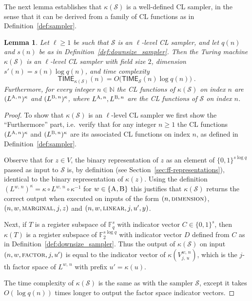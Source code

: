 \documentclass[11pt]{article}
\newtheorem{lemma}[theorem]{Lemma}
\theoremstyle{definition}
\newcommand{\N}{\ensuremath{\mathbb{N}}}
\newcommand{\F}{\ensuremath{\mathbb{F}}}
\newcommand{\downsize}{\kappa}
\newcommand{\sampler}{\mathcal{S}}
\newcommand{\gamestyle}[1]{\ensuremath{\textsc{#1}}\xspace}
\newcommand{\labelstyle}[1]{\ensuremath{\textsc{#1}}\xspace}
\newcommand{\alice}{\labelstyle{A}}
\newcommand{\bob}{\labelstyle{B}}
\newcommand{\ab}{\{\alice, \bob\}}
\newcommand{\TIME}{\mathsf{TIME}}
\begin{document}
The next lemma establishes that $\downsize(\sampler)$ is a well-defined CL
sampler, in the sense that it can be derived from a family of CL functions as in
Definition~\ref{def:sampler}.

\begin{lemma}
  \label{lem:downsize_sampler}
  Let $\ell \geq 1$ be such that $\sampler$ is an $\ell$-level CL sampler, and
  let $q(n)$ and $s(n)$ be as in Definition~\ref{def:downsize_sampler}.
  Then the Turing machine $\downsize(\sampler)$ is an $\ell$-level CL sampler
  with field size $2$, dimension $s'(n) = s(n) \log q(n)$, and
  time complexity
  \begin{equation*}
\TIME_{\downsize(\sampler)}(n) = O \bigl( \TIME_\sampler(n) \log q(n) \bigr)\;.
  \end{equation*}
  Furthermore, for every integer $n \in \N$ the CL functions of
  $\downsize(\sampler)$ on index $n$ are $(L^{\alice,\, n})^\downsize$ and
  $(L^{\bob,\, n})^\downsize$, where $L^{\alice,\, n}, L^{\bob,\, n}$ are the CL
  functions of $\sampler$ on index $n$.
\end{lemma}

\begin{proof} 
  To show that $\downsize(\sampler)$ is an $\ell$-level CL sampler we first show
  the ``Furthermore'' part, i.e.\ verify that for any integer $n\geq 1$ the CL
  functions $(L^{\alice,\, n})^\downsize$ and $(L^{\bob,\, n})^\downsize$ are its
  associated CL functions on index $n$, as defined in
  Definition~\ref{def:sampler}.

  Observe that for $z\in V$, the binary representation of $z$ as an element of
  $\{0,1\}^{s\log q}$ passed as input to $\sampler$ is, by definition (see
  Section~\ref{sec:ff-representations}), identical to the binary representation
  of $\downsize(z)$.
  Using the definition $(L^{w,\, n})^\downsize = \downsize \circ L^{w,\, n}
  \circ \downsize^{-1}$ for $w \in \ab$ this justifies that
  $\downsize(\sampler)$ returns the correct output when executed on inputs of
  the form $(n,\gamestyle{dimension})$, $(n,w,\gamestyle{marginal},j,z)$ and
  $(n, w, \gamestyle{linear}, j, u', y)$.

  Next, if $T$ is a register subspace of $\F_q^s$ with indicator vector $C \in
  \{0,1\}^s$, then $\downsize(T)$ is a register subspace of $\F_2^{s\log q}$
  with indicator vector $D$ defined from $C$ as in
  Definition~\ref{def:downsize_sampler}.
  Thus the output of $\downsize(\sampler)$ on input $(n, w, \gamestyle{factor},
  j, u')$ is equal to the indicator vector of $\downsize(V^{w,\, n}_{j,\, u})$,
  which is the $j$-th factor space of $L^{w,\, n}$ with prefix $u' =
  \downsize(u)$.

  The time complexity of $\downsize(\sampler)$ is the same as
  with the sampler $\sampler$, except it takes $O(\log q(n))$ times longer to
  output the factor space indicator vectors.

\end{proof}
\end{document}
